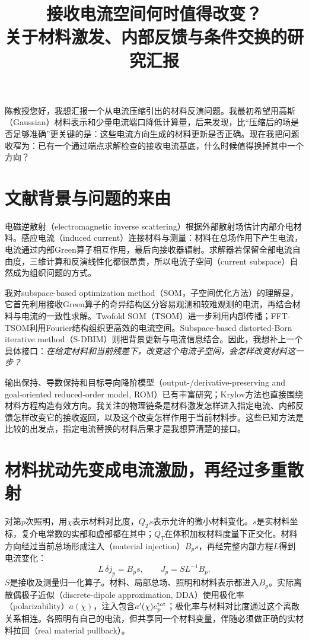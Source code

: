 \documentclass[UTF8,a4paper,11pt,fontset=none]{ctexart}
\title{接收电流空间何时值得改变？\\关于材料激发、内部反馈与条件交换的研究汇报}
\author{}\date{}
\begin{document}
\maketitle\vspace{-1.5em}
陈教授您好，我想汇报一个从电流压缩引出的材料反演问题。我最初希望用高斯（Gaussian）材料表示和少量电流端口降低计算量，后来发现，比“压缩后的场是否足够准确”更关键的是：这些电流方向生成的材料更新是否正确。现在我把问题收窄为：已有一个通过端点求解检查的接收电流基底，什么时候值得换掉其中一个方向？

\section{文献背景与问题的来由}
电磁逆散射（electromagnetic inverse scattering）根据外部散射场估计内部介电材料。感应电流（induced current）连接材料与测量：材料在总场作用下产生电流，电流通过内部Green算子相互作用，最后向接收器辐射。求解器若保留全部电流自由度，三维计算和反演线性化都很昂贵，所以电流子空间（current subspace）自然成为组织问题的方式。

我对subspace-based optimization method（SOM，子空间优化方法）的理解是，它首先利用接收Green算子的奇异结构区分容易观测和较难观测的电流，再结合材料与电流的一致性求解。Twofold SOM（TSOM）进一步利用内部传播；FFT-TSOM利用Fourier结构组织更高效的电流空间。Subspace-based distorted-Born iterative method（S-DBIM）则把背景更新与电流信息结合。因此，我想补上一个具体接口：\emph{在给定材料和当前残差下，改变这个电流子空间，会怎样改变材料这一步？}

输出保持、导数保持和目标导向降阶模型（output-/derivative-preserving and goal-oriented reduced-order model, ROM）已有丰富研究；Krylov方法也直接围绕材料方程构造有效方向。我关注的物理链条是材料激发怎样进入指定电流、内部反馈怎样改变它的接收返回，以及这个改变怎样作用于当前材料步。这些已知方法是比较的出发点，指定电流替换的材料后果才是我想算清楚的接口。

\section{材料扰动先变成电流激励，再经过多重散射}
对第$p$次照明，用$\chi$表示材料对比度，$Q_Ts$表示允许的微小材料变化。$s$是实材料坐标，复介电常数的实部和虚部都在其中；$Q_T$在体积加权材料度量下正交化。材料方向经过当前总场形成注入（material injection）$B_ps$，再经完整内部方程$L$得到电流变化：
\[
L\,\delta j_p=B_ps,\qquad J_p=SL^{-1}B_p.
\]
$S$是接收及测量归一化算子。材料、局部总场、照明和材料表示都进入$B_p$。实际离散偶极子近似（discrete-dipole approximation, DDA）使用极化率（polarizability）$a(\chi)$，注入包含$a'(\chi)e_p^{\rm tot}$；极化率与材料对比度通过这个离散关系相连。各照明有自己的电流，但共享同一个材料变量，伴随必须做正确的实材料拉回（real material pullback）。
\end{document}
